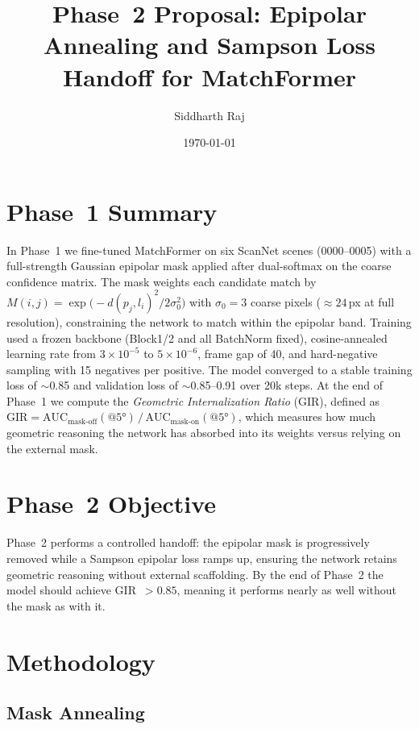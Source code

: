 \documentclass[11pt,a4paper]{article}
\title{Phase~2 Proposal: Epipolar Annealing and Sampson Loss Handoff for MatchFormer}
\author{Siddharth Raj}
\date{\today}
\begin{document}
\maketitle

\section{Phase~1 Summary}

In Phase~1 we fine-tuned MatchFormer on six ScanNet scenes (0000--0005) with a full-strength Gaussian epipolar mask applied after dual-softmax on the coarse confidence matrix.
The mask weights each candidate match by $M(i,j)=\exp\!\bigl(-d(p_j,l_i)^2/2\sigma_0^2\bigr)$ with $\sigma_0=3$ coarse pixels ($\approx24$\,px at full resolution), constraining the network to match within the epipolar band.
Training used a frozen backbone (Block1/2 and all BatchNorm fixed), cosine-annealed learning rate from $3\!\times\!10^{-5}$ to $5\!\times\!10^{-6}$, frame gap of 40, and hard-negative sampling with 15 negatives per positive.
The model converged to a stable training loss of $\sim$0.85 and validation loss of $\sim$0.85--0.91 over 20k steps.
At the end of Phase~1 we compute the \emph{Geometric Internalization Ratio} (GIR), defined as $\text{GIR}=\text{AUC}_{\text{mask-off}}(@5°)\,/\,\text{AUC}_{\text{mask-on}}(@5°)$, which measures how much geometric reasoning the network has absorbed into its weights versus relying on the external mask.

\section{Phase~2 Objective}

Phase~2 performs a controlled handoff: the epipolar mask is progressively removed while a Sampson epipolar loss ramps up, ensuring the network retains geometric reasoning without external scaffolding.
By the end of Phase~2 the model should achieve GIR~$>0.85$, meaning it performs nearly as well without the mask as with it.

\section{Methodology}

\subsection{Mask Annealing}
\end{document}
